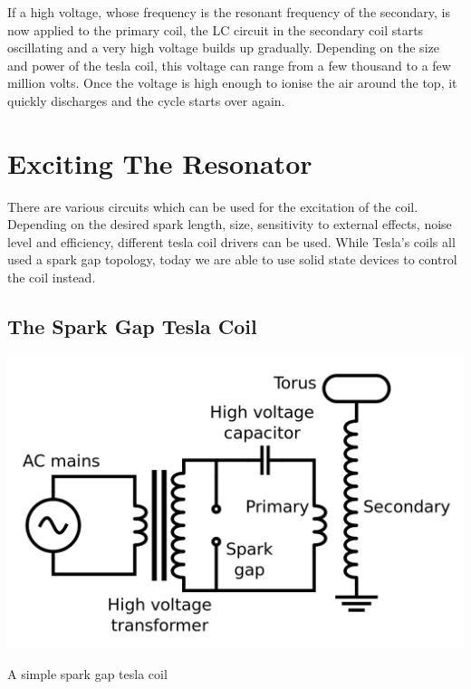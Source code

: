 If a high voltage, whose frequency is the resonant frequency of the secondary, is now applied to the primary coil, the LC circuit in the secondary coil starts oscillating and a very high voltage builds up gradually. Depending on the size and power of the tesla coil, this voltage can range from a few thousand to a few million volts. Once the voltage is high enough to ionise the air around the top, it quickly discharges and the cycle starts over again.

\section{Exciting The Resonator}

There are various circuits which can be used for the excitation of the coil. Depending on the desired spark length, size, sensitivity to external effects, noise level and efficiency, different tesla coil drivers can be used. While Tesla's coils all used a spark gap topology, today we are able to use solid state devices to control the coil instead.

\subsection{The Spark Gap Tesla Coil}

\begin{marginfigure}
\includegraphics[width=\textwidth]{simon/resources/sparkGapTeslaCoil.png}
\caption{A simple spark gap tesla coil}
\end{marginfigure}

